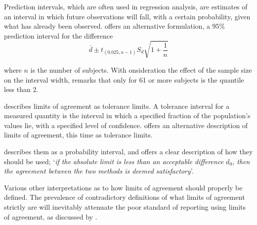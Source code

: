 \documentclass[12pt, a4paper]{report}
\theoremstyle{plain}
\theoremstyle{definition}
\theoremstyle{remark}
\begin{document}
Prediction intervals, which are often used in regression analysis, are estimates of an interval in which future
observations will fall, with a certain probability, given what has already been observed. \citet{BXC2008} offers an alternative
formulation, a $95\%$ prediction interval for the difference
\begin{equation}
\bar{d} \pm t_{(0.025, n-1)}S_{d} \sqrt{1+\frac{1}{n}}
\end{equation}

 where $n$ is the number of subjects. With onsideration the effect of the sample size on the interval
width, \citet{BXC2008} remarks that only for 61 or more subjects is the quantile less than 2.

\citet{luiz} describes limits of agreement as tolerance limits. A
tolerance interval for a measured quantity is the interval in
which a specified fraction of the population's values lie, with a
specified level of confidence. \citet{luiz} offers an alternative description of limits of agreement, this time as tolerance limits. 

\citet{Barnhart} describes them as a probability interval, and offers a clear description of how they should be used; `\textit{if the absolute limit is less than an acceptable difference $d_{0}$, then the agreement between the two methods is deemed satisfactory}'.

Various other interpretations as to how limits of agreement should properly be defined. The prevalence of contradictory definitions of what limits of agreement strictly are will inevitably attenuate the poor standard of reporting using limits of agreement, as discussed by \citet{mantha}.







\end{document}
